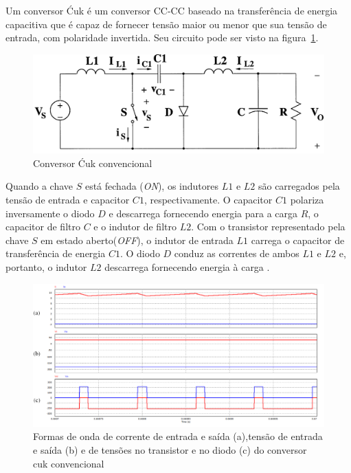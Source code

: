 \documentclass[
	12pt,				%
	openany,
	onseside,
	a4paper,			%
	english,			%
	french,				%
	spanish,			%
	brazil,				%
	]{abntex2}
\begin{document}
Um conversor Ćuk é um conversor CC-CC baseado na transferência de energia capacitiva que é capaz de fornecer tensão maior ou menor que sua tensão de entrada, com polaridade invertida. Seu circuito pode ser visto na figura~\ref{fig:conv_cuk_circuit}. 

\begin{figure}[htbp]
	\centering
		\includegraphics[width=0.55 \linewidth]{conv_cuk_circuit}
		\caption{Conversor Ćuk convencional \cite{RASHID_CUK}}
		\label{fig:conv_cuk_circuit}
\end{figure}


Quando a chave $S$ está fechada (\textit{ON}), os indutores $L1$ e $L2$ são carregados pela tensão de entrada e capacitor $C1$, respectivamente. O capacitor $C1$ polariza inversamente o diodo $D$ e descarrega fornecendo energia para a carga $R$, o capacitor de filtro $C$ e o indutor de filtro $L2$.
Com o transistor representado pela chave $S$ em estado aberto(\textit{OFF}), o indutor de entrada $L1$ carrega o capacitor de transferência de energia $C1$. O diodo $D$ conduz as correntes de ambos $L1$ e $L2$ e, portanto, o indutor $L2$ descarrega fornecendo energia à carga \cite{RASHID_CUK} \cite{JOSEPH_2015_Intervealed_CUK}. 

\begin{figure}[H]
	\captionsetup{justification=centering}
	\centering
		\includegraphics[width= \linewidth]{conv_cuk_signal_details}
		\caption{Formas de onda de corrente de entrada e saída (a),tensão de entrada e saída (b) e de tensões no transistor e no diodo (c) do conversor cuk convencional}
		\label{fig:conv_cuk_In_Out}
\end{figure}
\end{document}
